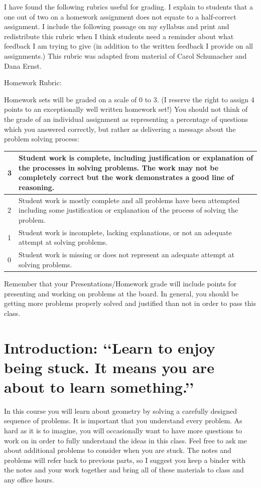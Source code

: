 \begin{annotation}
I have found the following rubrics useful for grading.  I explain to students that a one out of two on a homework assignment does not equate to a half-correct assignment. I include the following passage on my syllabus and print and redistribute this rubric when I think students need a reminder about what feedback I am trying to give (in addition to the written feedback I provide on all assignments.) This rubric was adapted from material of Carol Schumacher and Dana Ernst.

Homework Rubric:

Homework sets will be graded on a scale of 0 to 3. (I reserve the right to assign 4 points to an exceptionally well written homework set!) You should not think of the grade of an individual assignment as representing a percentage of questions which you answered correctly, but rather as delivering a message about the problem solving process:
\newline
\begin{tabular}{|l|p{11cm}|}
\hline
3 & Student work is complete, including justification or explanation of the processes in solving problems. The work may not be completely correct but the work demonstrates a good line of reasoning. \\
\hline
2 & Student work is mostly complete and all problems have been attempted including some justification or explanation of the process of solving the problem.\\
\hline
1 & Student work is incomplete, lacking explanations, or not an adequate attempt at solving problems. \\
\hline
0 & Student work is missing or does not represent an adequate attempt at solving problems. \\
\hline
\end{tabular}

Remember that your Presentations/Homework grade will include points for presenting and working on problems at the board. In general, you should be getting more problems properly solved and justified than not in order to pass this class.

\end{annotation}
\chapter{Introduction: \lq\lq{Learn to enjoy being stuck. It means you are about to learn something.}\rq\rq}


In this course you will learn about geometry by solving a carefully designed sequence of problems.  It is important that you understand every problem. As hard as it is to imagine, you will occasionally want to have more questions to work on in order to fully understand the ideas in this class. Feel free to ask me about additional problems to consider when you are stuck. The notes and problems will refer back to previous parts, so I suggest you keep a binder with the notes and your work together and bring all of these materials to class and any office hours.

